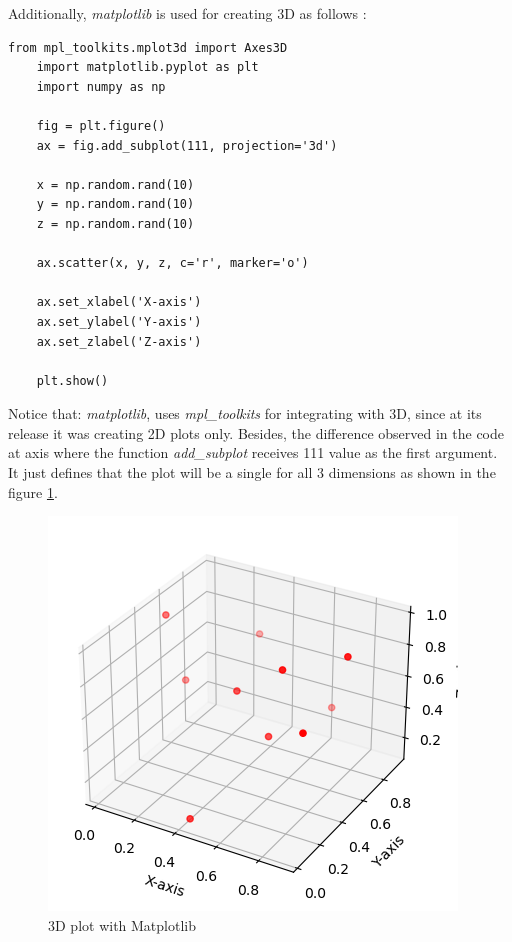 \documentclass[12pt,a4paper, oneside]{book}
\begin{document}
Additionally, \textit{matplotlib} is used for creating 3D as follows : 
\begin{lstlisting}[style=stylejupyter]
	from mpl_toolkits.mplot3d import Axes3D
	import matplotlib.pyplot as plt
	import numpy as np
	
	fig = plt.figure()
	ax = fig.add_subplot(111, projection='3d')
	
	x = np.random.rand(10)
	y = np.random.rand(10)
	z = np.random.rand(10)
	
	ax.scatter(x, y, z, c='r', marker='o')
	
	ax.set_xlabel('X-axis')
	ax.set_ylabel('Y-axis')
	ax.set_zlabel('Z-axis')
	
	plt.show()
\end{lstlisting} 
Notice that: \textit{matplotlib}, uses \textit{mpl\_toolkits} for integrating with 3D, since at its release it was creating 2D plots only. 
Besides, the difference observed in the code at axis where the function \textit{add\_subplot} receives 111 value as the first argument. It just defines that the plot will be a single for all 3 dimensions as shown in the figure \ref{fig:3ddimensionPlotlib}. 
\begin{figure}
	\centering
	\includegraphics[width=0.7\linewidth]{3Ddimension}
	\caption{3D plot with Matplotlib}
	\label{fig:3ddimensionPlotlib}
\end{figure}
\end{document}
